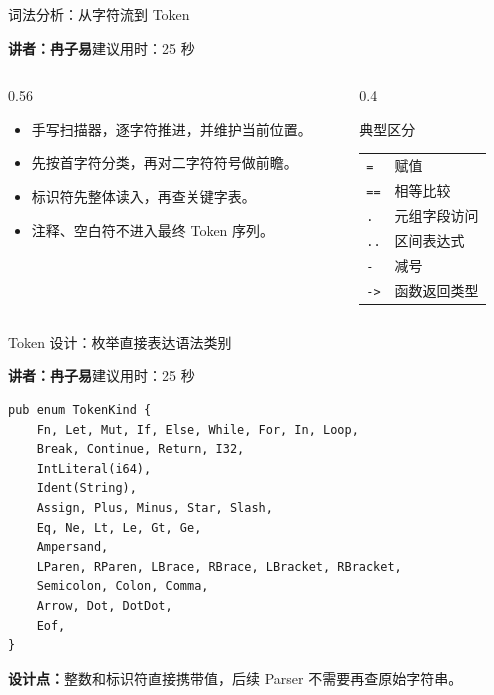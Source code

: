 \documentclass[aspectratio=169]{ctexbeamer}
\newcommand{\speaker}[2]{%
    \vspace{-0.4em}
    \begin{flushright}
        \scriptsize\color{mainblue}\textbf{讲者：#1}\quad 建议用时：#2
    \end{flushright}
    \vspace{-0.7em}
}
\begin{document}
\begin{frame}{词法分析：从字符流到 Token}
    \speaker{冉子易}{25 秒}
    \begin{columns}[T]
    \begin{column}{0.56\textwidth}
        \begin{itemize}
            \item 手写扫描器，逐字符推进，并维护当前位置。
            \item 先按首字符分类，再对二字符符号做前瞻。
            \item 标识符先整体读入，再查关键字表。
            \item 注释、空白符不进入最终 Token 序列。
        \end{itemize}
    \end{column}
    \begin{column}{0.4\textwidth}
        \begin{block}{典型区分}
            \small
            \begin{tabular}{ll}
                \texttt{=} & 赋值 \\
                \texttt{==} & 相等比较 \\
                \texttt{.} & 元组字段访问 \\
                \texttt{..} & 区间表达式 \\
                \texttt{-} & 减号 \\
                \texttt{->} & 函数返回类型 \\
            \end{tabular}
        \end{block}
    \end{column}
    \end{columns}
\end{frame}

\begin{frame}[fragile]{Token 设计：枚举直接表达语法类别}
    \speaker{冉子易}{25 秒}
    \begin{lstlisting}[style=code]
pub enum TokenKind {
    Fn, Let, Mut, If, Else, While, For, In, Loop,
    Break, Continue, Return, I32,
    IntLiteral(i64),
    Ident(String),
    Assign, Plus, Minus, Star, Slash,
    Eq, Ne, Lt, Le, Gt, Ge,
    Ampersand,
    LParen, RParen, LBrace, RBrace, LBracket, RBracket,
    Semicolon, Colon, Comma,
    Arrow, Dot, DotDot,
    Eof,
}
    \end{lstlisting}
    \vspace{-0.4em}
    \textbf{设计点：}整数和标识符直接携带值，后续 Parser 不需要再查原始字符串。
\end{frame}
\end{document}
